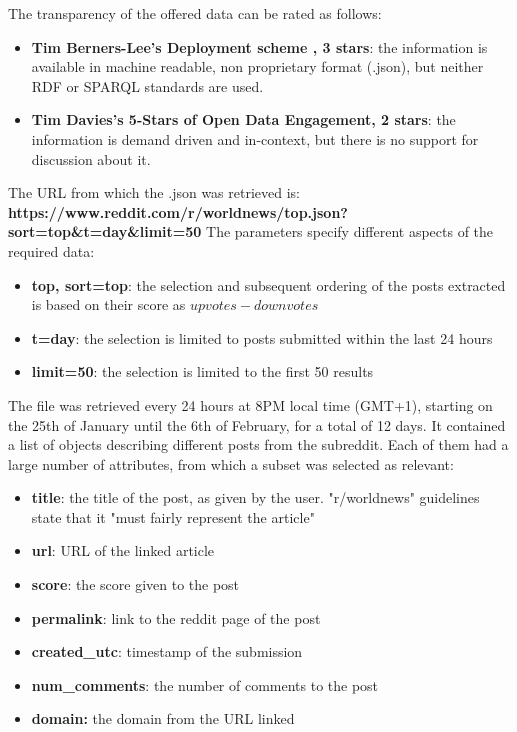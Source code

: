 \documentclass{article}
\begin{document}
The transparency of the offered data can be rated as follows:
\begin{itemize}
\item \textbf{Tim Berners-Lee's Deployment scheme \cite{5starsOD}, 3 stars}: the information is available in machine readable, non proprietary format (.json), but neither RDF or SPARQL standards are used.
\item \textbf{Tim Davies's 5-Stars of Open Data Engagement\cite{5starsdavies}, 2 stars}: the information is demand driven and in-context, but there is no support for discussion about it.

\end{itemize}
The URL from which the .json was retrieved is:\newline
\textbf{https://www.reddit.com/r/worldnews/top.json?sort=top\&t=day\&limit=50}
The parameters specify different aspects of the required data: 
\begin{itemize}
\item \textbf{top, sort=top}: the selection and subsequent ordering of the posts extracted is based on their score as \(upvotes-downvotes\)
\item \textbf{t=day}: the selection is limited to posts submitted within the last 24 hours
\item \textbf{limit=50}: the selection is limited to the first 50 results
\end{itemize}

The file was retrieved every 24 hours at 8PM local time (GMT+1), starting on the 25th of January until the 6th of February, for a total of 12 days. It contained a list of objects describing different posts from the subreddit. Each of them had a large number of attributes, from which a subset was selected as relevant:
\begin{itemize}
\item \textbf{title}: the title of the post, as given by the user. "r/worldnews" guidelines state that it "must fairly represent the article"
\item \textbf{url}: URL of the linked article
\item \textbf{score}: the score given to the post
\item \textbf{permalink}: link to the reddit page of the post
\item \textbf{created\_utc}: timestamp of the submission
\item \textbf{num\_comments}: the number of comments to the post
\item \textbf{domain:} the domain from the URL linked
\end{itemize}
\end{document}
